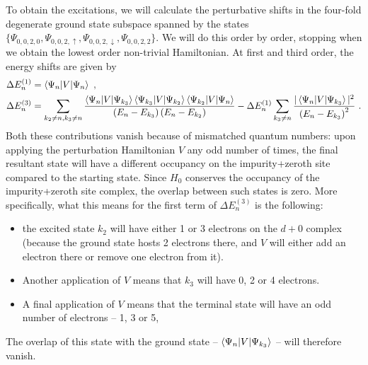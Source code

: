 To obtain the excitations, we will calculate the perturbative shifts in the four-fold degenerate ground state subspace spanned by the states \(\{\Psi_{0,0,2,0}, \Psi_{0,0,2,\uparrow}, \Psi_{0,0,2,\downarrow}, \Psi_{0,0,2,2}\}\). We will do this order by order, stopping when we obtain the lowest order non-trivial Hamiltonian. At first and third order, the energy shifts are given by
\begin{equation}\begin{aligned}
	\Delta E_n^{(1)} &= \braket{\Psi_n | V | \Psi_n}~,\\
	\Delta E_n^{(3)} &= \sum_{k_2 \neq n, k_3 \neq n} \frac{\braket{\Psi_n | V | \Psi_{k_3}}\braket{\Psi_{k_3} | V | \Psi_{k_2}}\braket{\Psi_{k_2} | V | \Psi_n}}{\left(E_n - E_{k_3}\right)\left(E_n - E_{k_2}\right)} - \Delta E_n^{(1)} \sum_{k_3 \neq n} \frac{|\braket{\Psi_n | V | \Psi_{k_3}}|^2}{\left(E_n - E_{k_3}\right)^2}~.
\end{aligned}\end{equation}
Both these contributions vanish because of mismatched quantum numbers: upon applying the perturbation Hamiltonian \(V\) any odd number of times, the final resultant state will have a different occupancy on the impurity+zeroth site  compared to the starting state. Since \(H_0\) conserves the occupancy of the impurity+zeroth site complex, the overlap between such states is zero. More specifically, what this means for the first term of \(\Delta E_n^{(3)}\) is the following:
\begin{itemize}
	\item the excited state \(k_2\) will have either 1 or 3 electrons on the \(d+0\) complex (because the ground state hosts 2 electrons there, and \(V\) will either add an electron there or remove one electron from it).
	\item Another application of \(V\) means that \(k_3\) will have 0, 2 or 4 electrons.
	\item A final application of \(V\) means that the terminal state will have an odd number of electrons -- 1, 3 or 5,
\end{itemize}
The overlap of this state with the ground state -- \(\braket{\Psi_n | V | \Psi_{k_3}}\) -- will therefore vanish.

